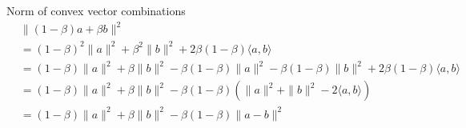 \documentclass{article}
\begin{document}
\begin{mylemma}
Norm of convex vector combinations
\begin{align}
& \| (1-\beta) a + \beta b \|^2 \\
& = (1-\beta)^2 \| a\|^2 + \beta^2 \| b\|^2 + 2 \beta(1-\beta) \langle a, b\rangle 
\nonumber \\
& = (1-\beta) \| a\|^2 + \beta \| b\|^2 - \beta (1-\beta) \|a\|^2 - \beta (1-\beta) \|b\|^2 + 2 \beta(1-\beta) \langle a, b\rangle 
\nonumber\\
&= (1-\beta) \| a\|^2 + \beta \| b\|^2 - \beta (1-\beta) \left( \| a\|^2 + \| b\|^2 - 2 \langle a, b \rangle \right)
\nonumber\\
&= (1-\beta) \| a\|^2 + \beta \| b\|^2 - \beta (1-\beta) \| a - b\|^2 
\nonumber
\end{align}
\end{mylemma}
\end{document}
